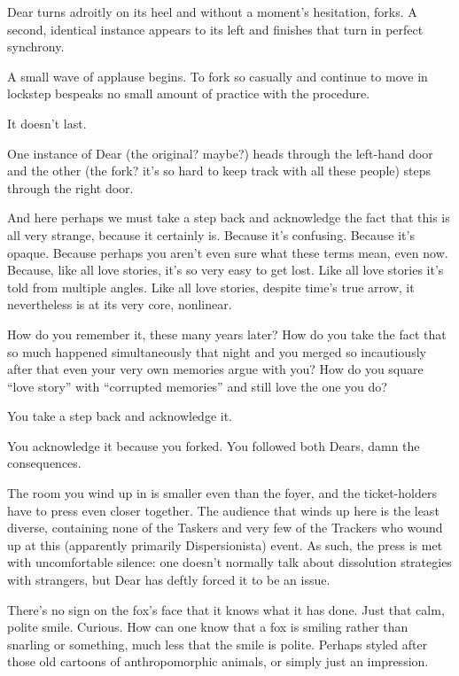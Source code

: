 Dear turns adroitly on its heel and without a moment's hesitation, forks. A second, identical instance appears to its left and finishes that turn in perfect synchrony.

A small wave of applause begins. To fork so casually and continue to move in lockstep bespeaks no small amount of practice with the procedure.

It doesn't last.

One instance of Dear (the original? maybe?) heads through the left-hand door and the other (the fork? it's so hard to keep track with all these people) steps through the right door.

\newpage

\null
\vfill

\noindent And here perhaps we must take a step back and acknowledge the fact that this is all very strange, because it certainly is. Because it's confusing. Because it's opaque. Because perhaps you aren't even sure what these terms mean, even now. Because, like all love stories, it's so very easy to get lost. Like all love stories it's told from multiple angles. Like all love stories, despite time's true arrow, it nevertheless is at its very core, nonlinear.

How do you remember it, these many years later? How do you take the fact that so much happened simultaneously that night and you merged so incautiously after that even your very own memories argue with you? How do you square ``love story'' with ``corrupted memories'' and still love the one you do?

You take a step back and acknowledge it.

You acknowledge it because you forked. You followed both Dears, damn the consequences.

\vfill

\newpage

\null
\vfill

\noindent The room you wind up in is smaller even than the foyer, and the ticket-holders have to press even closer together. The audience that winds up here is the least diverse, containing none of the Taskers and very few of the Trackers who wound up at this (apparently primarily Dispersionista) event. As such, the press is met with uncomfortable silence: one doesn't normally talk about dissolution strategies with strangers, but Dear has deftly forced it to be an issue.

There's no sign on the fox's face that it knows what it has done. Just that calm, polite smile. Curious. How can one know that a fox is smiling rather than snarling or something, much less that the smile is polite. Perhaps styled after those old cartoons of anthropomorphic animals, or simply just an impression.

